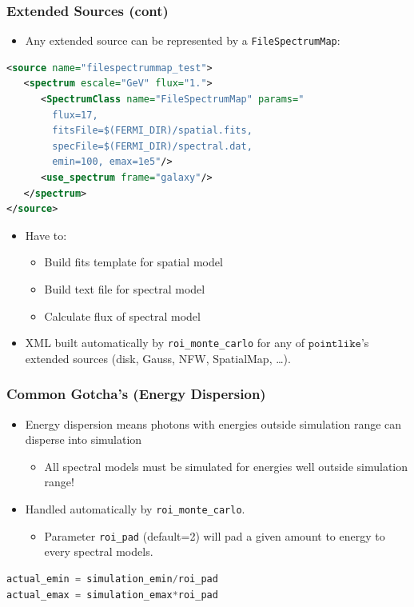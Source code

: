 \documentclass[12pt]{beamer}
\newcommand{\pointlike}{\ensuremath{\mathtt{pointlike}}\xspace}
\newcommand{\roimc}{\texttt{roi\_monte\_carlo}\xspace}
\newcommand{\FileSpectrumMap}{\texttt{FileSpectrumMap}\xspace}
\begin{document}
\begin{frame}[fragile]
\frametitle{Extended Sources (cont)}

  \begin{itemize}
    \item Any extended source can be represented by a \FileSpectrumMap:
  \end{itemize}
\begin{lstlisting}[language=XML]
<source name="filespectrummap_test">
   <spectrum escale="GeV" flux="1.">
      <SpectrumClass name="FileSpectrumMap" params="
        flux=17,
        fitsFile=$(FERMI_DIR)/spatial.fits,
        specFile=$(FERMI_DIR)/spectral.dat,
        emin=100, emax=1e5"/>
      <use_spectrum frame="galaxy"/>
   </spectrum>
</source>
\end{lstlisting}
  \begin{itemize}
    \item Have to:
      \begin{itemize}
        \item Build fits template for spatial model
        \item Build text file for spectral model
        \item Calculate flux of spectral model
      \end{itemize}
    \item XML built automatically by \roimc for any of \pointlike's extended
      sources (disk, Gauss, NFW, SpatialMap, \dots).
  \end{itemize}
\end{frame}


\begin{frame}[fragile]
  \frametitle{Common Gotcha's (Energy Dispersion)}
  \begin{itemize}
        \item Energy dispersion means photons with energies outside simulation range can
          disperse into simulation
          \begin{itemize}
            \item All spectral models must be simulated for energies well outside simulation range!
          \end{itemize}
        \item Handled automatically by \roimc. 
          \begin{itemize}
            \item Parameter \texttt{roi\_pad} (default=2) will pad a given
              amount to energy to every spectral models.
          \end{itemize}
      \end{itemize}
\begin{lstlisting}[language=Python]
actual_emin = simulation_emin/roi_pad
actual_emax = simulation_emax*roi_pad
\end{lstlisting}
\end{frame}
\end{document}
